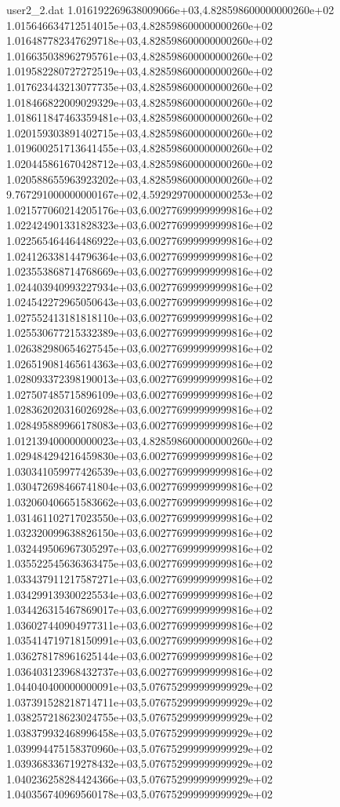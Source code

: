 \begin{filecontents}{user2_2.dat}
1.016192269638009066e+03,4.828598600000000260e+02
1.015646634712514015e+03,4.828598600000000260e+02
1.016487782347629718e+03,4.828598600000000260e+02
1.016635038962795761e+03,4.828598600000000260e+02
1.019582280727272519e+03,4.828598600000000260e+02
1.017623443213077735e+03,4.828598600000000260e+02
1.018466822009029329e+03,4.828598600000000260e+02
1.018611847463359481e+03,4.828598600000000260e+02
1.020159303891402715e+03,4.828598600000000260e+02
1.019600251713641455e+03,4.828598600000000260e+02
1.020445861670428712e+03,4.828598600000000260e+02
1.020588655963923202e+03,4.828598600000000260e+02
9.767291000000000167e+02,4.592929700000000253e+02
1.021577060214205176e+03,6.002776999999999816e+02
1.022424901331828323e+03,6.002776999999999816e+02
1.022565464464486922e+03,6.002776999999999816e+02
1.024126338144796364e+03,6.002776999999999816e+02
1.023553868714768669e+03,6.002776999999999816e+02
1.024403940993227934e+03,6.002776999999999816e+02
1.024542272965050643e+03,6.002776999999999816e+02
1.027552413181818110e+03,6.002776999999999816e+02
1.025530677215332389e+03,6.002776999999999816e+02
1.026382980654627545e+03,6.002776999999999816e+02
1.026519081465614363e+03,6.002776999999999816e+02
1.028093372398190013e+03,6.002776999999999816e+02
1.027507485715896109e+03,6.002776999999999816e+02
1.028362020316026928e+03,6.002776999999999816e+02
1.028495889966178083e+03,6.002776999999999816e+02
1.012139400000000023e+03,4.828598600000000260e+02
1.029484294216459830e+03,6.002776999999999816e+02
1.030341059977426539e+03,6.002776999999999816e+02
1.030472698466741804e+03,6.002776999999999816e+02
1.032060406651583662e+03,6.002776999999999816e+02
1.031461102717023550e+03,6.002776999999999816e+02
1.032320099638826150e+03,6.002776999999999816e+02
1.032449506967305297e+03,6.002776999999999816e+02
1.035522545636363475e+03,6.002776999999999816e+02
1.033437911217587271e+03,6.002776999999999816e+02
1.034299139300225534e+03,6.002776999999999816e+02
1.034426315467869017e+03,6.002776999999999816e+02
1.036027440904977311e+03,6.002776999999999816e+02
1.035414719718150991e+03,6.002776999999999816e+02
1.036278178961625144e+03,6.002776999999999816e+02
1.036403123968432737e+03,6.002776999999999816e+02
1.044040400000000091e+03,5.076752999999999929e+02
1.037391528218714711e+03,5.076752999999999929e+02
1.038257218623024755e+03,5.076752999999999929e+02
1.038379932468996458e+03,5.076752999999999929e+02
1.039994475158370960e+03,5.076752999999999929e+02
1.039368336719278432e+03,5.076752999999999929e+02
1.040236258284424366e+03,5.076752999999999929e+02
1.040356740969560178e+03,5.076752999999999929e+02

\end{filecontents}
